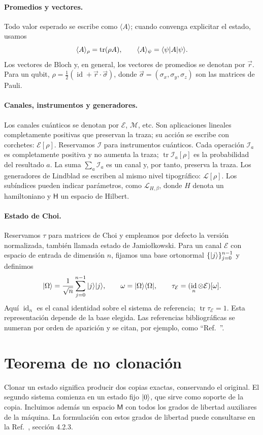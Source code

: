 \documentclass[letterpaper,12pt]{article}
\DeclareMathOperator{\tr}{tr}
\DeclareMathOperator{\id}{id}
\numberwithin{equation}{section}
\begin{document}
\paragraph{Promedios y vectores.}
Todo valor esperado se escribe como $\langle A\rangle$; cuando convenga
explicitar el estado, usamos
\[
  \langle A\rangle_\rho=\tr(\rho A),
  \qquad
  \langle A\rangle_\psi=\bra{\psi}A\ket{\psi}.
\]
Los vectores de Bloch y, en general, los vectores de promedios se denotan
por $\vec r$. Para un qubit,
$\rho=\tfrac12(\id+\vec r\cdot\vec\sigma)$, donde
$\vec\sigma=(\sigma_x,\sigma_y,\sigma_z)$ son las matrices de Pauli.

\paragraph{Canales, instrumentos y generadores.}
Los canales cuánticos se denotan por $\mathcal{E}$, $\mathcal{M}$, etc.
Son aplicaciones lineales completamente positivas que preservan la traza;
su acción se escribe con corchetes: $\mathcal{E}[\rho]$.
Reservamos $\mathcal{I}$ para instrumentos cuánticos. Cada operación
$\mathcal{I}_a$ es completamente positiva y no aumenta la traza;
$\tr\mathcal{I}_a[\rho]$ es la probabilidad del resultado $a$.
La suma $\sum_a\mathcal{I}_a$ es un canal y, por tanto, preserva la traza.
Los generadores de Lindblad se escriben al mismo nivel tipográfico:
$\mathcal{L}[\rho]$. Los subíndices pueden indicar parámetros, como
$\mathcal{L}_{H,\beta}$, donde $H$ denota un hamiltoniano y
$\mathsf H$ un espacio de Hilbert.

\paragraph{Estado de Choi.}
Reservamos $\tau$ para matrices de Choi y empleamos por defecto la
versión normalizada, también llamada estado de Jamio\l kowski. Para un
canal $\mathcal{E}$ con espacio de entrada de dimensión $n$, fijamos una
base ortonormal $\{{\vert j \rangle}\}_{j=0}^{n-1}$ y definimos
\[
  \ket{\Omega}=\frac{1}{\sqrt n}\sum_{j=0}^{n-1}\ket{j}\ket{j},
  \qquad \omega=\proj{\Omega}{\Omega},
  \qquad \tau_{\mathcal{E}}=(\id_n\otimes\mathcal{E})[\omega].
\]
Aquí $\id_n$ es el canal identidad sobre el sistema de referencia;
$\tr\tau_{\mathcal{E}}=1$. Esta representación depende de la base elegida.
Las referencias bibliográficas se numeran por orden de aparición y se
citan, por ejemplo, como ``Ref.~\cite{preskill}''.

\section{Teorema de no clonación}
Clonar un estado significa producir dos copias exactas, conservando el
original. El segundo sistema comienza en un estado fijo ${\vert 0 \rangle}$,
que sirve como soporte de la copia. Incluimos además un espacio
$\mathsf M$ con todos los grados de libertad auxiliares de la máquina.
La formulación con estos grados de libertad puede consultarse en la
Ref.~\cite{preskill}, sección 4.2.3.
\end{document}

